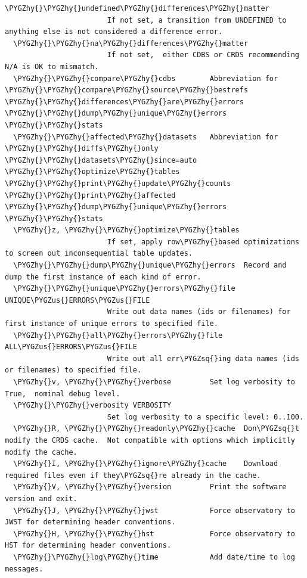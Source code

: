 \documentclass[letterpaper,10pt,english]{sphinxmanual}
\def\PYGZus{\char`\_}
\def\PYGZhy{\char`\-}
\def\PYGZsq{\char`\'}
\begin{document}
\begin{Verbatim}[commandchars=\\\{\}]
  \PYGZhy{}\PYGZhy{}undefined\PYGZhy{}differences\PYGZhy{}matter
                        If not set, a transition from UNDEFINED to anything else is not considered a difference error.
  \PYGZhy{}\PYGZhy{}na\PYGZhy{}differences\PYGZhy{}matter
                        If not set,  either CDBS or CRDS recommending N/A is OK to mismatch.
  \PYGZhy{}\PYGZhy{}compare\PYGZhy{}cdbs        Abbreviation for \PYGZhy{}\PYGZhy{}compare\PYGZhy{}source\PYGZhy{}bestrefs \PYGZhy{}\PYGZhy{}differences\PYGZhy{}are\PYGZhy{}errors \PYGZhy{}\PYGZhy{}dump\PYGZhy{}unique\PYGZhy{}errors \PYGZhy{}\PYGZhy{}stats
  \PYGZhy{}\PYGZhy{}affected\PYGZhy{}datasets   Abbreviation for \PYGZhy{}\PYGZhy{}diffs\PYGZhy{}only \PYGZhy{}\PYGZhy{}datasets\PYGZhy{}since=auto \PYGZhy{}\PYGZhy{}optimize\PYGZhy{}tables \PYGZhy{}\PYGZhy{}print\PYGZhy{}update\PYGZhy{}counts \PYGZhy{}\PYGZhy{}print\PYGZhy{}affected \PYGZhy{}\PYGZhy{}dump\PYGZhy{}unique\PYGZhy{}errors \PYGZhy{}\PYGZhy{}stats
  \PYGZhy{}z, \PYGZhy{}\PYGZhy{}optimize\PYGZhy{}tables
                        If set, apply row\PYGZhy{}based optimizations to screen out inconsequential table updates.
  \PYGZhy{}\PYGZhy{}dump\PYGZhy{}unique\PYGZhy{}errors  Record and dump the first instance of each kind of error.
  \PYGZhy{}\PYGZhy{}unique\PYGZhy{}errors\PYGZhy{}file UNIQUE\PYGZus{}ERRORS\PYGZus{}FILE
                        Write out data names (ids or filenames) for first instance of unique errors to specified file.
  \PYGZhy{}\PYGZhy{}all\PYGZhy{}errors\PYGZhy{}file ALL\PYGZus{}ERRORS\PYGZus{}FILE
                        Write out all err\PYGZsq{}ing data names (ids or filenames) to specified file.
  \PYGZhy{}v, \PYGZhy{}\PYGZhy{}verbose         Set log verbosity to True,  nominal debug level.
  \PYGZhy{}\PYGZhy{}verbosity VERBOSITY
                        Set log verbosity to a specific level: 0..100.
  \PYGZhy{}R, \PYGZhy{}\PYGZhy{}readonly\PYGZhy{}cache  Don\PYGZsq{}t modify the CRDS cache.  Not compatible with options which implicitly modify the cache.
  \PYGZhy{}I, \PYGZhy{}\PYGZhy{}ignore\PYGZhy{}cache    Download required files even if they\PYGZsq{}re already in the cache.
  \PYGZhy{}V, \PYGZhy{}\PYGZhy{}version         Print the software version and exit.
  \PYGZhy{}J, \PYGZhy{}\PYGZhy{}jwst            Force observatory to JWST for determining header conventions.
  \PYGZhy{}H, \PYGZhy{}\PYGZhy{}hst             Force observatory to HST for determining header conventions.
  \PYGZhy{}\PYGZhy{}log\PYGZhy{}time            Add date/time to log messages.
\end{Verbatim}
\end{document}
